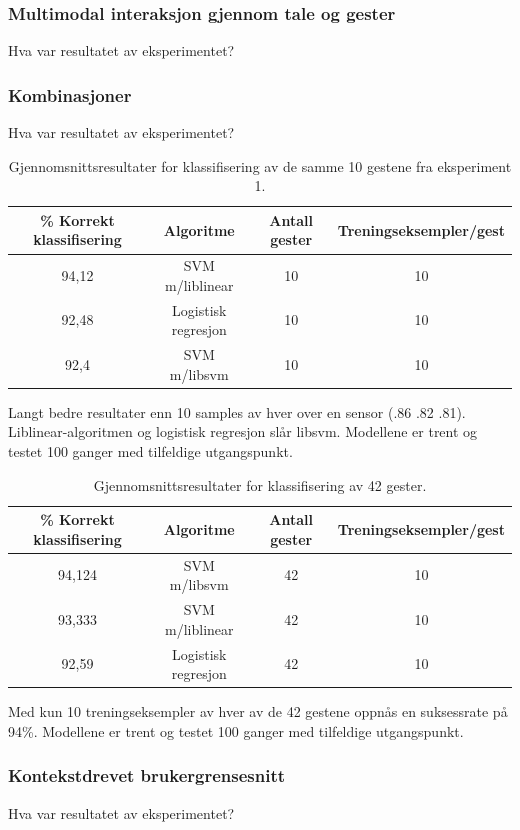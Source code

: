 \subsubsection{Multimodal interaksjon gjennom tale og gester}
{\color{red}Hva var resultatet av eksperimentet?}


\subsubsection{Kombinasjoner}
{\color{red}Hva var resultatet av eksperimentet?}

\begin{table}[h!]
\centering
\begin{tabular}{|| c c c c ||}
\hline
\% Korrekt klassifisering & Algoritme & Antall gester & Treningseksempler/gest \\ [0.5ex] 
 \hline\hline
 94,12 & SVM m/liblinear & 10 & 10 \\ 
 \hline
 92,48 & Logistisk regresjon & 10 & 10 \\ [1ex]
 \hline
 92,4 & SVM m/libsvm & 10 & 10 \\
 \hline
\end{tabular}
\caption{Gjennomsnittsresultater for klassifisering av de samme 10 gestene fra eksperiment 1.}
\label{table:results-foursensors}
\end{table}

Langt bedre resultater enn 10 samples av hver over en sensor (.86 .82 .81). Liblinear-algoritmen og logistisk regresjon slår libsvm.  Modellene er trent og testet 100 ganger med tilfeldige utgangspunkt.

\begin{table}[h!]
\centering
\begin{tabular}{|| c c c c ||}
\hline
\% Korrekt klassifisering & Algoritme & Antall gester & Treningseksempler/gest\\ [0.5ex] 
 \hline\hline
 94,124 & SVM m/libsvm & 42 & 10 \\ 
 \hline
 93,333 & SVM m/liblinear & 42 & 10 \\
 \hline
 92,59 & Logistisk regresjon & 42 & 10 \\ [1ex]
 \hline
\end{tabular}
\caption{Gjennomsnittsresultater for klassifisering av 42 gester.}
\label{table:results-foursensors}
\end{table}

Med kun 10 treningseksempler av hver av de 42 gestene oppnås en suksessrate på 94\%. Modellene er trent og testet 100 ganger med tilfeldige utgangspunkt.

\subsubsection{Kontekstdrevet brukergrensesnitt}
{\color{red}Hva var resultatet av eksperimentet?}
